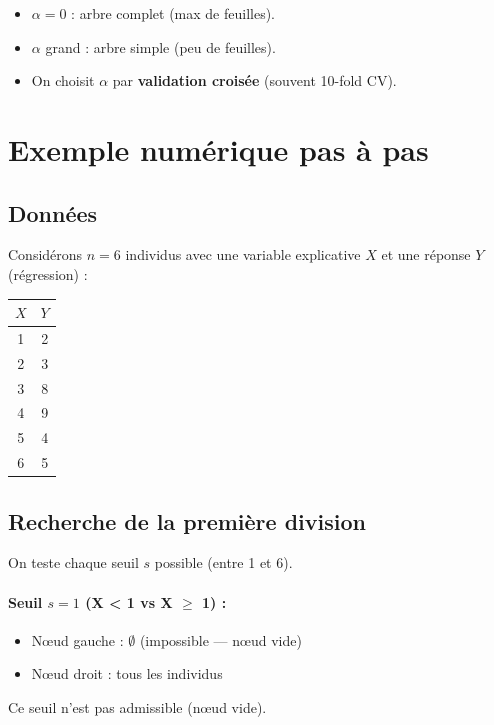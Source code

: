 \documentclass[a4paper,11pt]{article}
\begin{document}
\begin{itemize}
    \item $\alpha = 0$ : arbre complet (max de feuilles).
    \item $\alpha$ grand : arbre simple (peu de feuilles).
    \item On choisit $\alpha$ par \textbf{validation croisée} (souvent 10-fold CV).
\end{itemize}

\section{Exemple numérique pas à pas}

\subsection{Données}
Considérons $n = 6$ individus avec une variable explicative $X$ et une réponse $Y$ (régression) :

\begin{center}
\begin{tabular}{c|c}
$X$ & $Y$ \\
\hline
1 & 2 \\
2 & 3 \\
3 & 8 \\
4 & 9 \\
5 & 4 \\
6 & 5 \\
\end{tabular}
\end{center}

\subsection{Recherche de la première division}

On teste chaque seuil $s$ possible (entre 1 et 6).

\paragraph{Seuil $s = 1$ (X < 1 vs X $\ge$ 1) :}
\begin{itemize}
    \item Nœud gauche : $\emptyset$ (impossible — nœud vide)
    \item Nœud droit : tous les individus
\end{itemize}
Ce seuil n'est pas admissible (nœud vide).
\end{document}
